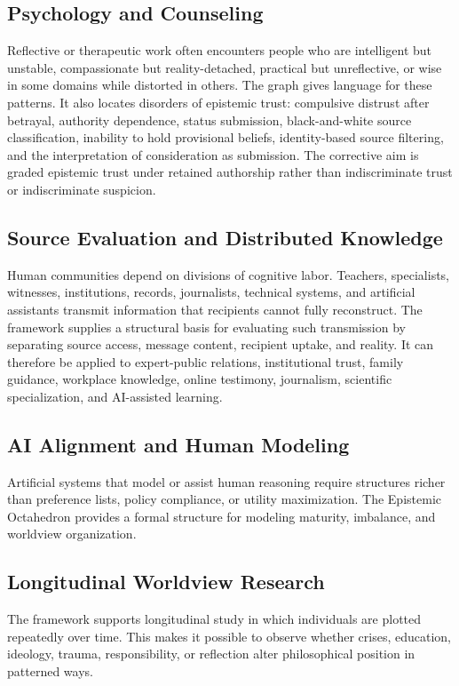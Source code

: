 \documentclass[11pt]{article}
\begin{document}
\subsection{Psychology and Counseling}
Reflective or therapeutic work often encounters people who are intelligent but unstable, compassionate but reality-detached, practical but unreflective, or wise in some domains while distorted in others. The graph gives language for these patterns. It also locates disorders of epistemic trust: compulsive distrust after betrayal, authority dependence, status submission, black-and-white source classification, inability to hold provisional beliefs, identity-based source filtering, and the interpretation of consideration as submission. The corrective aim is graded epistemic trust under retained authorship rather than indiscriminate trust or indiscriminate suspicion.

\subsection{Source Evaluation and Distributed Knowledge}
Human communities depend on divisions of cognitive labor. Teachers, specialists, witnesses, institutions, records, journalists, technical systems, and artificial assistants transmit information that recipients cannot fully reconstruct. The framework supplies a structural basis for evaluating such transmission by separating source access, message content, recipient uptake, and reality. It can therefore be applied to expert-public relations, institutional trust, family guidance, workplace knowledge, online testimony, journalism, scientific specialization, and AI-assisted learning.

\subsection{AI Alignment and Human Modeling}
Artificial systems that model or assist human reasoning require structures richer than preference lists, policy compliance, or utility maximization. The Epistemic Octahedron provides a formal structure for modeling maturity, imbalance, and worldview organization.

\subsection{Longitudinal Worldview Research}
The framework supports longitudinal study in which individuals are plotted repeatedly over time. This makes it possible to observe whether crises, education, ideology, trauma, responsibility, or reflection alter philosophical position in patterned ways.
\end{document}
